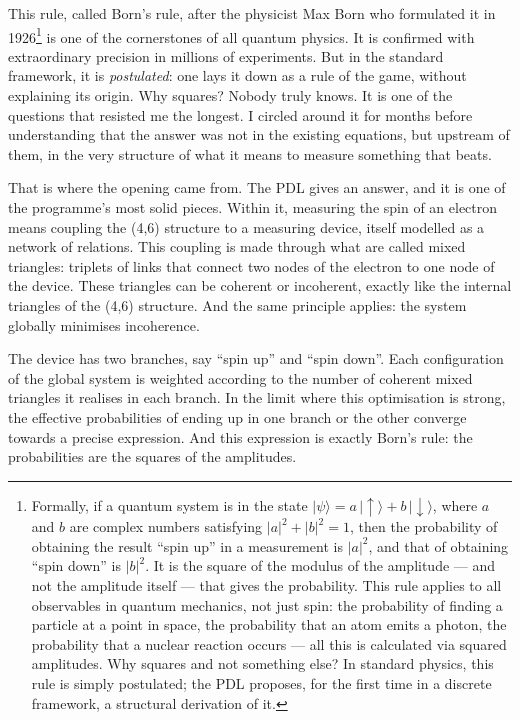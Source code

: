\documentclass[12pt, a4paper, openright]{book}
\begin{document}
This rule, called Born’s rule, after the physicist Max Born who formulated it in 1926\footnote{%
    Formally, if a quantum system is in the state $|\psi\rangle = a\,|\!\uparrow\rangle + b\,|\!\downarrow\rangle$, where $a$ and $b$ are complex numbers satisfying $|a|^2 + |b|^2 = 1$, then the probability of obtaining the result “spin up” in a measurement is $|a|^2$, and that of obtaining “spin down” is $|b|^2$. It is the square of the modulus of the amplitude — and not the amplitude itself — that gives the probability. This rule applies to all observables in quantum mechanics, not just spin: the probability of finding a particle at a point in space, the probability that an atom emits a photon, the probability that a nuclear reaction occurs — all this is calculated via squared amplitudes. Why squares and not something else? In standard physics, this rule is simply postulated; the PDL proposes, for the first time in a discrete framework, a structural derivation of it.} 
is one of the cornerstones of all quantum physics. It is confirmed with extraordinary precision in millions of experiments. But in the standard framework, it is \emph{postulated}: one lays it down as a rule of the game, without explaining its origin. Why squares? Nobody truly knows. It is one of the questions that resisted me the longest. I circled around it for months before understanding that the answer was not in the existing equations, but upstream of them, in the very structure of what it means to measure something that beats.

\medskip

That is where the opening came from. The PDL gives an answer, and it is one of the programme’s most solid pieces. Within it, measuring the spin of an electron means coupling the (4,6) structure to a measuring device, itself modelled as a network of relations. This coupling is made through what are called mixed triangles: triplets of links that connect two nodes of the electron to one node of the device. These triangles can be coherent or incoherent, exactly like the internal triangles of the (4,6) structure. And the same principle applies: the system globally minimises incoherence.

\medskip

The device has two branches, say “spin up” and “spin down”. Each configuration of the global system is weighted according to the number of coherent mixed triangles it realises in each branch. In the limit where this optimisation is strong, the effective probabilities of ending up in one branch or the other converge towards a precise expression. And this expression is exactly Born’s rule: the probabilities are the squares of the amplitudes.
\end{document}
